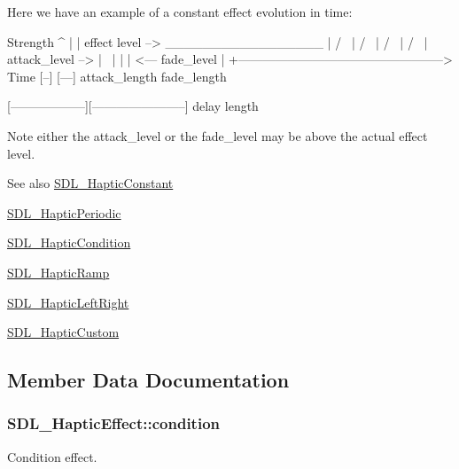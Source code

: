Here we have an example of a constant effect evolution in time\+: \begin{DoxyVerb}Strength
^
|
|    effect level -->  _________________
|                     /                 \
|                    /                   \
|                   /                     \
|                  /                       \
| attack_level --> |                        \
|                  |                        |  <---  fade_level
|
+--------------------------------------------------> Time
                   [--]                 [---]
                   attack_length        fade_length

[------------------][-----------------------]
delay               length
\end{DoxyVerb}


Note either the attack\+\_\+level or the fade\+\_\+level may be above the actual effect level.

\begin{DoxySeeAlso}{See also}
\hyperlink{struct_s_d_l___haptic_constant}{S\+D\+L\+\_\+\+Haptic\+Constant} 

\hyperlink{struct_s_d_l___haptic_periodic}{S\+D\+L\+\_\+\+Haptic\+Periodic} 

\hyperlink{struct_s_d_l___haptic_condition}{S\+D\+L\+\_\+\+Haptic\+Condition} 

\hyperlink{struct_s_d_l___haptic_ramp}{S\+D\+L\+\_\+\+Haptic\+Ramp} 

\hyperlink{struct_s_d_l___haptic_left_right}{S\+D\+L\+\_\+\+Haptic\+Left\+Right} 

\hyperlink{struct_s_d_l___haptic_custom}{S\+D\+L\+\_\+\+Haptic\+Custom} 
\end{DoxySeeAlso}


\subsection{Member Data Documentation}
\subsubsection[{\texorpdfstring{condition}{condition}}]{ S\+D\+L\+\_\+\+Haptic\+Effect\+::condition}\hypertarget{union_s_d_l___haptic_effect_aa8fdd1ba202ccd7e61f48ef9977080d2}{}\label{union_s_d_l___haptic_effect_aa8fdd1ba202ccd7e61f48ef9977080d2}
Condition effect. 
